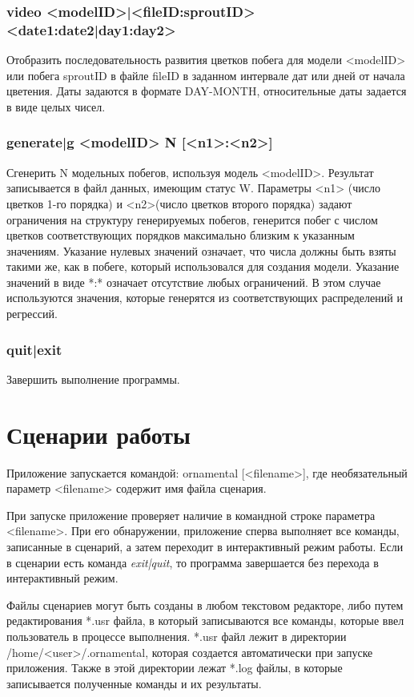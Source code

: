 \documentclass[a4paper]{article}
\begin{document}
\subsubsection{video <modelID>|<fileID:sproutID> <date1:date2|day1:day2>}
Отобразить последовательность развития цветков побега для модели <modelID> или побега sproutID в файле fileID в заданном интервале дат или дней от начала цветения. Даты задаются в формате DAY-MONTH, относительные даты задается в виде целых чисел.

\subsubsection{generate|g <modelID> N [<n1>:<n2>]}
Сгенерить N модельных побегов, используя модель <modelID>. Результат записывается в файл данных, имеющим статус W. Параметры <n1> (число цветков 1-го порядка) и <n2>(число цветков второго порядка) задают ограничения на структуру генерируемых побегов, генерится побег с числом цветков соответствующих порядков максимально близким к указанным значениям. Указание нулевых значений означает, что числа должны быть взяты такими же, как в побеге, который использовался для создания модели. Указание значений в виде *:* означает отсутствие любых ограничений. В этом случае используются значения, которые генерятся из соответствующих распределений и регрессий.

\subsubsection{quit|exit}
Завершить выполнение программы.

\section{Сценарии работы}

Приложение запускается командой:
ornamental [<filename>], где необязательный параметр <filename> содержит имя файла сценария. 

При запуске приложение проверяет наличие в командной строке параметра <filename>. При его обнаружении, приложение сперва выполняет все команды, записанные в сценарий, а затем переходит в интерактивный режим работы. Если в сценарии есть команда \textit{exit|quit}, то программа завершается без перехода в интерактивный режим.

Файлы сценариев могут быть созданы в любом текстовом редакторе, либо путем редактирования *.usr файла, в который записываются все команды, которые ввел пользователь в процессе выполнения. *.usr файл лежит в директории /home/<user>/.ornamental, которая создается автоматически при запуске приложения.
Также в этой директории лежат *.log файлы, в которые записывается полученные команды и их результаты.
\end{document}
